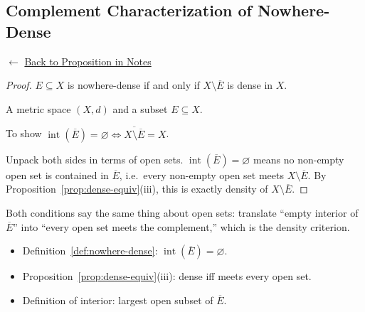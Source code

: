 
\subsection*{Complement Characterization of Nowhere-Dense}
\label{prf:nowhere-dense-equiv}

\begin{remark*}[Return]
$\leftarrow$ \hyperref[prop:nowhere-dense-equiv]{Back to Proposition in Notes}
\end{remark*}

\begin{proof}
\Claim $E \subseteq X$ is nowhere-dense if and only if
$X \setminus \overline{E}$ is dense in $X$.

\Given A metric space $(X,d)$ and a subset $E \subseteq X$.

\Goal To show $\operatorname{int}(\overline{E}) = \varnothing
\iff \overline{X \setminus \overline{E}} = X$.

\Strategy Unpack both sides in terms of open sets.
$\operatorname{int}(\overline{E}) = \varnothing$ means no non-empty open set
is contained in $\overline{E}$, i.e.\ every non-empty open set meets $X \setminus \overline{E}$.
By Proposition~\ref{prop:dense-equiv}(iii), this is exactly density of $X \setminus \overline{E}$.


\end{proof}

\begin{remark*}
Both conditions say the same thing about open sets: translate
``empty interior of $\overline{E}$'' into ``every open set meets the complement,''
which is the density criterion.
\end{remark*}

\begin{remark*}[Dependencies]
\begin{itemize}
  \item Definition~\ref{def:nowhere-dense}: $\operatorname{int}(\overline{E}) = \varnothing$.
  \item Proposition~\ref{prop:dense-equiv}(iii): dense iff meets every open set.
  \item Definition of interior: largest open subset of $\overline{E}$.
\end{itemize}
\end{remark*}
